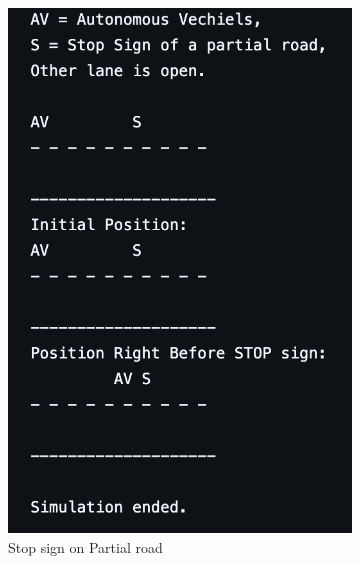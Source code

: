 \documentclass[conference]{IEEEtran}
\begin{document}
\begin{figure}[h] %
    \centering
    \begin{subfigure}[b]{0.3\textwidth}
        \includegraphics[width=\linewidth]{Fig/PL_Stop_S1.png}
        \caption{Stop sign on Partial road}
    \end{subfigure}
    \hfill
    \begin{subfigure}[b]{0.3\textwidth}

\end{subfigure}
\end{figure}
\end{document}

